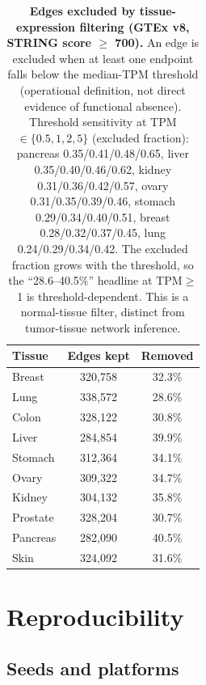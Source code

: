 \documentclass[11pt,a4paper]{article}
\begin{document}
\begin{table}[H]
\centering
\caption{\textbf{Edges excluded by tissue-expression filtering (GTEx v8, STRING score $\geq$ 700).} An edge is excluded when at least one endpoint falls below the median-TPM threshold (operational definition, not direct evidence of functional absence). Threshold sensitivity at TPM $\in \{0.5, 1, 2, 5\}$ (excluded fraction): pancreas 0.35/0.41/0.48/0.65, liver 0.35/0.40/0.46/0.62, kidney 0.31/0.36/0.42/0.57, ovary 0.31/0.35/0.39/0.46, stomach 0.29/0.34/0.40/0.51, breast 0.28/0.32/0.37/0.45, lung 0.24/0.29/0.34/0.42. The excluded fraction grows with the threshold, so the ``28.6--40.5\%'' headline at TPM$\geq$1 is threshold-dependent. This is a normal-tissue filter, distinct from tumor-tissue network inference.}
\label{tab:s10}
\footnotesize
\begin{tabular}{@{}lcc@{}}
\toprule
\textbf{Tissue} & \textbf{Edges kept} & \textbf{Removed} \\
\midrule
Breast & 320,758 & 32.3\% \\
Lung & 338,572 & 28.6\% \\
Colon & 328,122 & 30.8\% \\
Liver & 284,854 & 39.9\% \\
Stomach & 312,364 & 34.1\% \\
Ovary & 309,322 & 34.7\% \\
Kidney & 304,132 & 35.8\% \\
Prostate & 328,204 & 30.7\% \\
Pancreas & 282,090 & 40.5\% \\
Skin & 324,092 & 31.6\% \\
\bottomrule
\end{tabular}
\end{table}

\FloatBarrier


\section{Reproducibility}

\subsection{Seeds and platforms}
\end{document}
